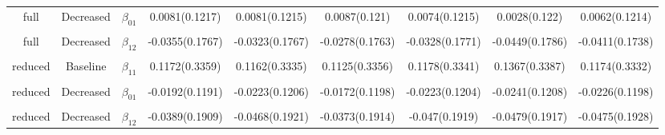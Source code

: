\documentclass[
]{article}
\begin{document}
\begin{landscape}
\begin{longtable}{ccccccccc}
full & Decreased & $\beta_{01}$ & 0.0081(0.1217) & 0.0081(0.1215) & 0.0087(0.121) & 0.0074(0.1215) & 0.0028(0.122) & 0.0062(0.1214)\\
\addlinespace
\cellcolor{gray!15}{full} & \cellcolor{gray!15}{Decreased} & \cellcolor{gray!15}{$\beta_{11}$} & \cellcolor{gray!15}{0.0702(0.3057)} & \cellcolor{gray!15}{0.0636(0.3043)} & \cellcolor{gray!15}{0.0544(0.3045)} & \cellcolor{gray!15}{0.0645(0.3072)} & \cellcolor{gray!15}{0.0837(0.3073)} & \cellcolor{gray!15}{0.0897(0.3006)}\\
full & Decreased & $\beta_{12}$ & -0.0355(0.1767) & -0.0323(0.1767) & -0.0278(0.1763) & -0.0328(0.1771) & -0.0449(0.1786) & -0.0411(0.1738)\\
\cellcolor{gray!15}{reduced} & \cellcolor{gray!15}{Baseline} & \cellcolor{gray!15}{$\beta_{01}$} & \cellcolor{gray!15}{-0.0235(0.1308)} & \cellcolor{gray!15}{-0.0231(0.1305)} & \cellcolor{gray!15}{-0.0157(0.1327)} & \cellcolor{gray!15}{-0.0231(0.1306)} & \cellcolor{gray!15}{-0.0287(0.1324)} & \cellcolor{gray!15}{-0.0241(0.1305)}\\
reduced & Baseline & $\beta_{11}$ & 0.1172(0.3359) & 0.1162(0.3335) & 0.1125(0.3356) & 0.1178(0.3341) & 0.1367(0.3387) & 0.1174(0.3332)\\
\cellcolor{gray!15}{reduced} & \cellcolor{gray!15}{Baseline} & \cellcolor{gray!15}{$\beta_{12}$} & \cellcolor{gray!15}{-0.0436(0.2163)} & \cellcolor{gray!15}{-0.0429(0.2157)} & \cellcolor{gray!15}{-0.041(0.2172)} & \cellcolor{gray!15}{-0.0438(0.2151)} & \cellcolor{gray!15}{-0.0542(0.2174)} & \cellcolor{gray!15}{-0.044(0.2155)}\\
\addlinespace
reduced & Decreased & $\beta_{01}$ & -0.0192(0.1191) & -0.0223(0.1206) & -0.0172(0.1198) & -0.0223(0.1204) & -0.0241(0.1208) & -0.0226(0.1198)\\
\cellcolor{gray!15}{reduced} & \cellcolor{gray!15}{Decreased} & \cellcolor{gray!15}{$\beta_{11}$} & \cellcolor{gray!15}{0.0966(0.3114)} & \cellcolor{gray!15}{0.112(0.314)} & \cellcolor{gray!15}{0.0926(0.3126)} & \cellcolor{gray!15}{0.1127(0.3138)} & \cellcolor{gray!15}{0.1137(0.313)} & \cellcolor{gray!15}{0.1131(0.3132)}\\
reduced & Decreased & $\beta_{12}$ & -0.0389(0.1909) & -0.0468(0.1921) & -0.0373(0.1914) & -0.047(0.1919) & -0.0479(0.1917) & -0.0475(0.1928)\\*
\end{longtable}
\end{landscape}
\end{document}
